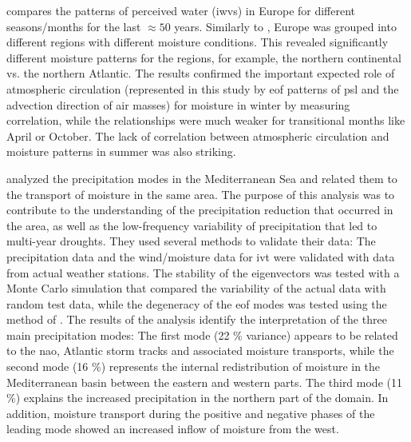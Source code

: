\cite{wypych_atmospheric_2018} compares the patterns of perceived water (\acp{iwv}) in Europe for different seasons/months for the last $\approx50$ years. 
Similarly to \cite{ayantobo_integrated_2022}, Europe was grouped into different regions with different moisture conditions. 
This revealed significantly different moisture patterns for the regions, for example, the northern continental vs. the northern Atlantic.
The results confirmed the important expected role of atmospheric circulation (represented in this study by \ac{eof} patterns of \ac{psl} and the advection direction of air masses) for moisture in winter by measuring correlation, while the relationships were much weaker for transitional months like April or October. 
The lack of correlation between atmospheric circulation and moisture patterns in summer was also striking. \cite{wypych_atmospheric_2018}


 


\citeauthor{fernandez_analysis_2003} analyzed the precipitation modes in the Mediterranean Sea and related them to the transport of moisture in the same area. 
The purpose of this analysis was to contribute to the understanding of the precipitation reduction that occurred in the area, as well as the low-frequency variability of precipitation that led to multi-year droughts.
They used several methods to validate their data: The precipitation data and the wind/moisture data for \ac{ivt} were validated with data from actual weather stations. 
The stability of the eigenvectors was tested with a Monte Carlo simulation that compared the variability of the actual data with random test data, while the degeneracy of the \ac{eof} modes was tested using the method of . 
The results of the analysis identify the interpretation of the three main precipitation modes:
The first mode (22 \% variance) appears to be related to the \ac{nao}, Atlantic storm tracks and associated moisture transports, while the second mode (16 \%) represents the internal redistribution of moisture in the Mediterranean basin between the eastern and western parts.  
The third mode (11 \%) explains the increased precipitation in the northern part of the domain. 
In addition, moisture transport during the positive and negative phases of the leading mode showed an increased inflow of moisture from the west. \cite{fernandez_analysis_2003} 



